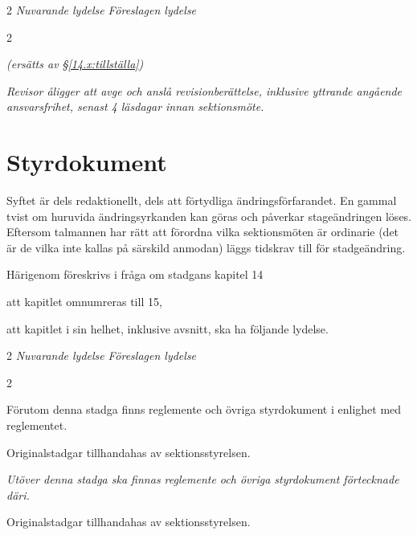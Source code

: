 \documentclass{article}
\newenvironment{lydelse}
    {\begin{paracol}{2}%
        \emph{Nuvarande lydelse}%
        \switchcolumn%
        \emph{Föreslagen lydelse}%
    \end{paracol}%
    \begin{enumerate}[label=\thesubsection.\arabic*]%
    \begin{paracol}{2}%
    }{\end{paracol}\end{enumerate}}
\begin{document}
\begin{lydelse}
  \switchcolumn
  \item[] \emph{(ersätts av \S\ref{14.x:tillställa})}
 
  \item \emph{Revisor åligger att avge och anslå revisionberättelse, inklusive yttrande angående ansvarsfrihet, senast 4 läsdagar innan sektionsmöte.}

\end{lydelse}
\setcounter{section}{14}
\setcounter{subsection}{2}
\setcounter{enumi}{0}

\section{Styrdokument}
Syftet är dels redaktionellt, dels att förtydliga ändringsförfarandet.
En gammal tvist om huruvida ändringsyrkanden kan göras och påverkar stageändringen löses.
Eftersom talmannen har rätt att förordna vilka sektionsmöten är ordinarie (det är de vilka inte kallas på särskild anmodan) läggs tidskrav till för stadgeändring.

Härigenom föreskrivs i fråga om stadgans kapitel 14
\begin{dels}
  \item att kapitlet omnumreras till 15,
  \item att kapitlet i sin helhet, inklusive avsnitt, ska ha följande lydelse.
\end{dels}

\begin{lydelse}
  \setcounter{section}{14}
  \setcounter{subsection}{1}
  \item Förutom denna stadga finns reglemente och övriga styrdokument i enlighet med reglementet.
  \setcounter{subsection}{6}
  \setcounter{enumi}{0}  
  \item Originalstadgar tillhandahas av sektionsstyrelsen.
  \switchcolumn
  \item \emph{Utöver denna stadga ska finnas reglemente och övriga styrdokument förtecknade däri.}
  \item Originalstadgar tillhandahas av sektionsstyrelsen.
\end{lydelse}
\setcounter{section}{15}
\setcounter{subsection}{0}
\end{document}
